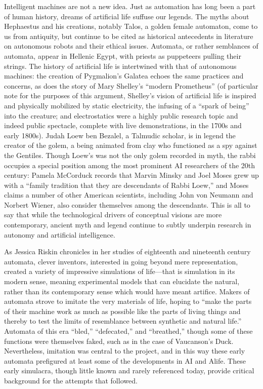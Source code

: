 Intelligent machines are not a new idea. Just as automation has long
been a part of human history, dreams of artificial life suffuse our
legends. The myths about Hephaestus and
his creations, notably Talos, a golden female automaton, come to us
from antiquity,\cite{mccorduck}  but continue to be cited as historical antecedents in
literature on autonomous robots and their ethical issues.\cite[p. 3]{patricklin} Automata,
or rather semblances of automata, appear in Hellenic Egypt, with
priests as puppeteers pulling their strings.\cite[Ch. 1]{mccorduck} The history of
artificial life is intertwined with that of autonomous machines: the
creation of Pygmalion's Galatea echoes the same practices and
concerns, as does the story of Mary Shelley's “modern Prometheus” (of
particular note for the purposes of this argument, Shelley's vision of
artificial life is inspired and physically mobilized by static
electricity, the infusing of a ``spark of being'' into the creature; and
electrostatics were a highly public research topic and indeed public
spectacle, complete with live demonstrations, in the 1700s and early
1800s).\cite[p. 44]{shelley} Judah Loew ben Bezalel, a Talmudic scholar, is in legend the
creator of the golem, a being animated from clay who functioned as a
spy against the Gentiles.\cite[Ch. 1]{mccorduck} Though Loew's was not the only golem
recorded in myth, the rabbi occupies a special position among the most
prominent AI researchers of the 20th century: Pamela McCorduck records
that Marvin Minsky and Joel Moses grew up with a ``family tradition
that they are descendants of Rabbi Loew,'' and Moses claims a number of
other American scientists, including John von Neumann and Norbert
Wiener, also consider themselves among the descendants.\cite[Ch. 1]{mccorduck} This is all
to say that while the technological drivers of conceptual visions are
more contemporary, ancient myth and legend continue to subtly underpin
research in autonomy and artificial intelligence.

As Jessica Riskin chronicles in her studies of eighteenth and
nineteenth century automata, clever inventors, interested in going
beyond mere representation, created a variety of impressive
simulations of life---that is simulation in its modern sense, meaning
experimental models that can elucidate the natural, rather than its
contemporary sense which would have meant artifice.\cite[p. ??]{riskinDuck}
Makers of automata strove to imitate the very materials of life,
hoping to ``make the parts of their machine work as much as possible
like the parts of living things and thereby to test the limits of
resemblance between synthetic and natural life.''\cite[p. ??]{riskinDuck}
Automata of this era ``bled,'' ``defecated,'' and ``breathed,'' though some
of these functions were themselves faked, such as in the case of
Vaucanson's Duck. Nevertheless, imitation was central to the project,
and in this way these early automata prefigured at least some of the
developments in AI and Alife. These early simulacra, though little known and
rarely referenced today, provide critical background for the attempts
that followed. 

